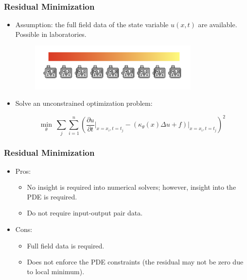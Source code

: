 \documentclass{beamer}
\begin{document}
\begin{frame}
	\frametitle{Residual Minimization}
	\begin{itemize}
		\item Assumption: the full field data of the state variable $u(x, t)$ are available. Possible in laboratories. 
		\begin{figure}[hbt]
		\centering
  \includegraphics[width=0.8\textwidth]{figures/fullfield}
\end{figure}

\item Solve an unconstrained optimization problem:

$$\min_\theta \ \sum_{j}\sum_{i=1}^n \left(\frac{\partial u}{\partial t}\Big|_{x = x_i, t = t_j} - \left( {\kappa_\theta(x)}\Delta u + f\right)\Big|_{x = x_i, t = t_j}\right)^2$$
	\end{itemize}
\end{frame}

\begin{frame}
	\frametitle{Residual Minimization}
	\begin{itemize}
		\item Pros:
		\begin{itemize}
		\item No insight is required into numerical solvers; however, insight into the PDE is required. 
		\item Do not require input-output pair data. 
		\end{itemize}
		\item Cons:
		\begin{itemize}
		\item Full field data is required. 
		\item Does not enforce the PDE constraints (the residual may not be zero due to local minimum).
		\end{itemize}
		
	\end{itemize}
\end{frame}
\end{document}
